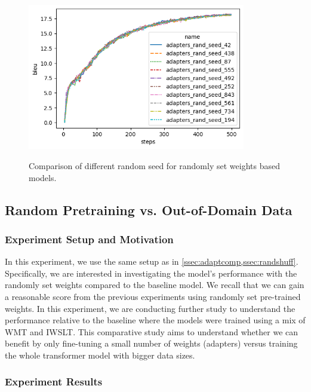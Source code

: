 \begin{figure}[h]
    {\includegraphics[width=0.85\textwidth]{img/adapter_random_multiseed.png}}
    \centering
    \caption{Comparison of different random seed for randomly set weights based models.}
    \label{img:rndmseed}
\end{figure}

\subsection{Random Pretraining vs. Out-of-Domain Data}
\label{ssec:randpre}
\subsubsection{Experiment Setup and Motivation}
In this experiment, we use the same setup as in \cref{ssec:adaptcomp,ssec:randshuff}. Specifically, we are interested in investigating the model's performance with the randomly set weights compared to the baseline model. We recall that we can gain a reasonable score from the previous experiments using randomly set pre-trained weights. In this experiment, we are conducting further study to understand the performance relative to the baseline where the models were trained using a mix of WMT and IWSLT. This comparative study aims to understand whether we can benefit by only fine-tuning a small number of weights (adapters) versus training the whole transformer model with bigger data sizes.

\subsubsection{Experiment Results}

